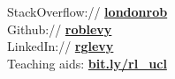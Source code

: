 \documentclass[a4paper,nomath]{deedy-resume} %
\begin{document}
\begin{paracol}{2}
    StackOverflow:// \href{http://stackoverflow.com/londonrob}{\bf londonrob} \\
    Github:// \href{https://github.com/roblevy}{\bf roblevy} \\
    LinkedIn:// \href{http://uk.linkedin.com/in/rglevy}{\bf rglevy} \\
    \sectionspace
    Teaching aids: \href{http://www.homepages.ucl.ac.uk/~ucfnlev/}{\bf bit.ly/rl\_ucl}

    \sectionspace %


\end{paracol}







\end{document}
